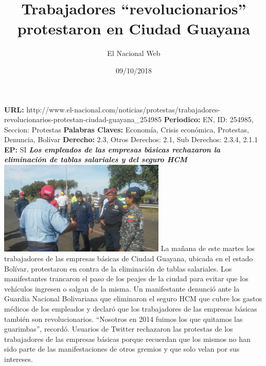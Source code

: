 \documentclass{article}%
\title{\textbf{Trabajadores “revolucionarios” protestaron en Ciudad Guayana}}%
\author{El Nacional Web}%
\date{09/10/2018}%
\begin{document}
%
\normalsize%
\maketitle%
\textbf{URL: }%
http://www.el{-}nacional.com/noticias/protestas/trabajadores{-}revolucionarios{-}protestan{-}ciudad{-}guayana\_254985\newline%
%
\textbf{Periodico: }%
EN, %
ID: %
254985, %
Seccion: %
Protestas\newline%
%
\textbf{Palabras Claves: }%
Economía, Crisis económica, Protestas, Denuncia, Bolívar\newline%
%
\textbf{Derecho: }%
2.3, %
Otros Derechos: %
2.1, %
Sub Derechos: %
2.3.4, 2.1.1\newline%
%
\textbf{EP: }%
SI\newline%
\newline%
%
\textbf{\textit{Los empleados de las empresas básicas rechazaron la eliminación de tablas salariales y del seguro HCM}}%
\newline%
\newline%
%
\includegraphics[width=300px]{10.jpg}%
\newline%
%
La mañana de este martes los trabajadores de las empresas básicas de Ciudad Guayana, ubicada en el estado Bolívar, protestaron en contra de la eliminación de tablas salariales.%
\newline%
%
Los manifestantes trancaron el paso de los peajes de la ciudad para evitar que los vehículos ingresen o salgan de la misma.%
\newline%
%
Un manifestante denunció ante la Guardia Nacional Bolivariana que eliminaron el seguro HCM que cubre los gastos médicos de los empleados y declaró que los trabajadores de las empresas básicas también son revolucionarios.%
\newline%
%
“Nosotros en 2014 fuimos los que quitamos las guarimbas”, recordó.%
\newline%
%
Usuarios de Twitter rechazaron las protestas de los trabajadores de las empresas básicas porque recuerdan que los mismos no han sido parte de las manifestaciones de otros gremios y que solo velan por sus intereses.%
\newline%
%
\end{document}
